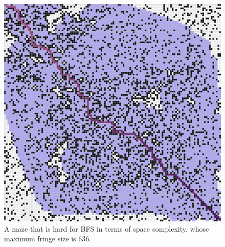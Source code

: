 \documentclass[letter]{article}
\begin{document}
\begin{enumerate}[resume]
\begin{enumerate}
\begin{enumerate}
\begin{figure}
					\includegraphics[width=\textwidth]{../pics/aef/636.png}
					\caption{\label{fig:aef1}A maze that is hard for BFS in terms of space complexity, whose maximum fringe size is 636. }
					

\end{figure}
\end{enumerate}
\end{enumerate}
\end{enumerate}
\end{document}
